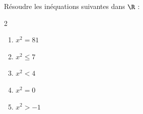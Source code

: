 \begin{exo}{}
	Résoudre les inéquations suivantes dans $\R$ :
	\vspace*{-2mm}
	\begin{multicols}{2}
	\begin{enumerate}[itemsep=2mm]
		\item $x^2 = 81$
		\item $x^2 \le 7$
		\item $x^2 < 4$
		\item $x^2 = 0$
		\item $x^2 > -1$
	\end{enumerate}
	\end{multicols}\vspace*{-2mm}
\end{exo}
